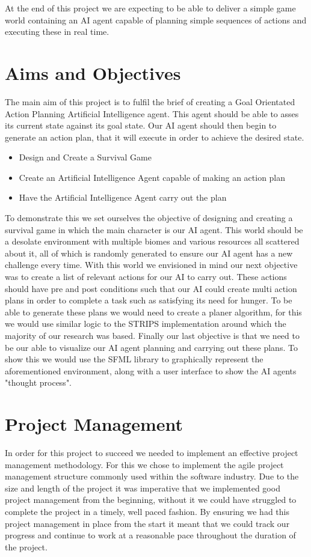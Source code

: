 \documentclass[a4paper]{report}
\begin{document}
At the end of this project we are expecting to be able to deliver a simple game world containing an AI agent capable of planning simple sequences of actions and executing these in real time. 

\chapter{Aims and Objectives}
The main aim of this project is to fulfil the brief of creating a Goal Orientated Action Planning Artificial Intelligence agent. This agent should be able to asses its current state against its goal state. Our AI agent should then begin to generate an action plan, that it will execute in order to achieve the desired state. \newline

\begin{itemize}
	\item Design and Create a Survival Game
	\item Create an Artificial Intelligence Agent capable of making an action plan
	\item Have the Artificial Intelligence Agent carry out the plan 
\end{itemize}

To demonstrate this we set ourselves the objective of designing and creating a survival game in which the main character is our AI agent. This world should be a desolate environment with multiple biomes and various resources all scattered about it, all of which is randomly generated to ensure our AI agent has a new challenge every time. With this world we envisioned in mind our next objective was to create a list of relevant actions for our AI to carry out. These actions should have pre and post conditions such that our AI could create multi action plans in order to complete a task such as satisfying its need for hunger. To be able to generate these plans we would need to create a planer algorithm, for this we would use similar logic to the STRIPS implementation around which the majority of our research was based. Finally our last objective is that we need to be our able to visualize our AI agent planning and carrying out these plans. To show this we would use the SFML library to graphically represent the aforementioned environment, along with a user interface to show the AI agents "thought process".
 
\chapter{Project Management}
In order for this project to succeed we needed to implement an effective project management methodology. For this we chose to implement the agile project management structure commonly used within the software industry. Due to the size and length of the project it was imperative that we implemented good project management from the beginning, without it we could have struggled to complete the project in a timely, well paced fashion. By ensuring we had this project management in place from the start it meant that we could track our progress and continue to work at a reasonable pace throughout the duration of the project.
\end{document}
